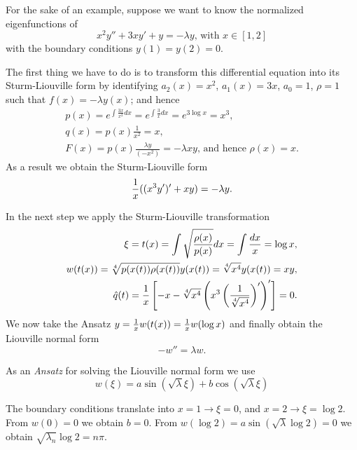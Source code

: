 {
\color{blue}
\bexample

For the sake of an example, suppose we want to know the normalized eigenfunctions of
\begin{equation}
x^2y'' + 3xy' + y =- \lambda y \textrm{, with } x\in [1,2]
\end{equation}
with the boundary conditions $y(1) = y(2) =0$.

The first thing we have to do is to  transform this differential equation
into its Sturm-Liouville form by identifying $a_2(x)=x^2$,
$a_1(x)=   3x$, $a_0 =1$, $\rho = 1$ such that $f (x)= - \lambda y (x)$; and hence
\begin{equation}
\begin{split}
p(x)=e^{\int \frac{ 3x }{ x^2 } dx}=e^{\int \frac{3}{x} dx}=e^{3\log{x}}=x^3,\\
q(x)=p(x) \frac{ 1 }{ x^2 }= x,\\
F(x)=p(x) \frac{\lambda y}{(-x^2)}= -\lambda x y\textrm{, and hence } \rho(x)= x
.
\end{split}
\end{equation}
As a result we obtain the  Sturm-Liouville form
\begin{equation}
{1\over x}((x^3y')' + xy)=-\lambda y .
\end{equation}

In the next step we apply the Sturm-Liouville transformation
\begin{equation}
\begin{split}
\xi= t (x)  =\int\sqrt{\rho (x)\over p(x)}dx=\int{dx\over x}=\log x,\\
w(t(x))=\sqrt[4]{p(x(t))\rho(x(t))} y (x(t))= \sqrt[4]{x^4} y (x(t))= x y,\\
\hat{q}(t)= \frac{1}{x}\left[-x -\sqrt[4]{x^4 }
\left(x^3\left( \frac{1}{\sqrt[4]{x^4 }}\right)'\right)'\right] =0
.
\end{split}
\end{equation}
We now take the {Ansatz} $y={1\over x} w ( t (x))={1\over x} w (\log x)$
and finally obtain  the Liouville normal form
\begin{equation}
- w ''=\lambda  w .
\end{equation}

As an {\em Ansatz}
for solving the Liouville normal form we use
\begin{equation}   w (\xi)=a\sin(\sqrt{\lambda}\xi)+b\cos(\sqrt{\lambda}\xi)
\end{equation}

The boundary conditions translate into $x=1\rightarrow\xi=0$,
and $x=2\rightarrow \xi=\log 2$.
From
$w (0)=0$ we obtain $b=0$.
From
$w (\log 2)=a\sin(\sqrt{\lambda}\log2)=0$
we obtain
$\sqrt{\lambda_n}\log2=n\pi$.

}
